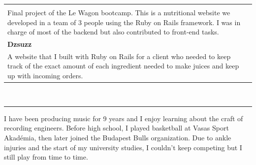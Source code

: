\documentclass{article}
\begin{document}
\begin{tabular}{l l}
\begin{minipage}{120mm}
        \noindent
        \textbf{Nutri} \\
        Final project of the Le Wagon bootcamp. This is a nutritional website we developed in a team of 3 people using the Ruby on Rails framework. I was in charge of most of the backend but also contributed to front-end tasks.
        \smallskip \\

        \noindent
        \textbf{Dzsuzz} \\
        A website that I built with Ruby on Rails for a client who needed to keep track of the exact amount of each ingredient needed to make juices and keep up with incoming orders. 
    \end{minipage}
\end{tabular}

\vspace{5mm}
\noindent

 \\
\hrule
\bigskip

I have been producing music for 9 years and I enjoy learning about the craft of recording engineers. Before high school, I played basketball at Vasas Sport Akadémia, then later joined the Budapest Bulls organization. Due to ankle injuries and the start of my university studies, I couldn't keep competing but I still play from time to time.
\end{document}
